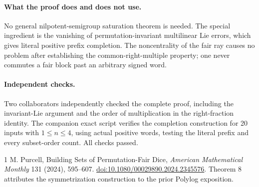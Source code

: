 \documentclass[11pt]{article}
\begin{document}
\paragraph{What the proof does and does not use.}
No general nilpotent-semigroup saturation theorem is needed. The
special ingredient is the vanishing of permutation-invariant
multilinear Lie errors, which gives literal positive prefix completion.
The noncentrality of the fair ray causes no problem after establishing
the common-right-multiple property; one never commutes a fair block
past an arbitrary signed word.

\paragraph{Independent checks.}
Two collaborators independently checked the complete proof, including
the invariant-Lie argument and the order of multiplication in the
right-fraction identity. The companion exact script verifies the
completion construction for 20 inputs with $1\le n\le4$, using actual
positive words, testing the literal prefix and every subset-order count.
All checks passed.
\begin{thebibliography}{1}
M. Purcell, Building Sets of Permutation-Fair Dice,
\emph{American Mathematical Monthly} 131 (2024), 595--607.
\href{https://doi.org/10.1080/00029890.2024.2345576}{doi:10.1080/00029890.2024.2345576}.
Theorem 8 attributes the symmetrization construction to the prior
Polylog exposition.
\end{thebibliography}
\end{document}

